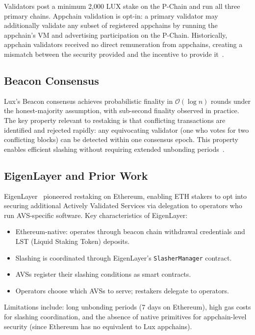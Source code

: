 \documentclass[11pt]{article}
\begin{document}
Validators post a minimum 2,000 LUX stake on the P-Chain and run all three primary chains.
Appchain validation is opt-in: a primary validator may additionally validate any subset of
registered appchains by running the appchain's VM and advertising participation on the P-Chain.
Historically, appchain validators received no direct remuneration from appchains, creating a
mismatch between the security provided and the incentive to provide it~\cite{lux2020platform}.

\subsection{Beacon Consensus}

Lux's Beacon consensus achieves probabilistic finality in $\mathcal{O}(\log n)$ rounds
under the honest-majority assumption, with sub-second finality observed in practice. The
key property relevant to restaking is that conflicting transactions are identified and
rejected rapidly: any equivocating validator (one who votes for two conflicting blocks) can
be detected within one consensus epoch. This property enables efficient slashing without
requiring extended unbonding periods~\cite{rocket2019wave}.

\subsection{EigenLayer and Prior Work}

EigenLayer~\cite{eigen2023restaking} pioneered restaking on Ethereum, enabling ETH stakers
to opt into securing additional Actively Validated Services via delegation to operators who
run AVS-specific software. Key characteristics of EigenLayer:

\begin{itemize}[leftmargin=1.5em]
  \item Ethereum-native: operates through beacon chain withdrawal credentials and LST
    (Liquid Staking Token) deposits.
  \item Slashing is coordinated through EigenLayer's \texttt{SlasherManager} contract.
  \item AVSs register their slashing conditions as smart contracts.
  \item Operators choose which AVSs to serve; restakers delegate to operators.
\end{itemize}

Limitations include: long unbonding periods (7 days on Ethereum), high gas costs for
slashing coordination, and the absence of native primitives for appchain-level security
(since Ethereum has no equivalent to Lux appchains).
\end{document}
